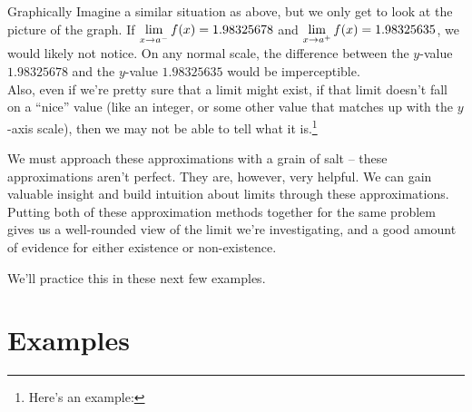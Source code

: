 \begin{defn}{Graphically}
  Imagine a similar situation as above, but we only get to look at the picture of the graph.
  If $\displaystyle \lim_{x\to a^-} f(x) = 1.98325678$ and $\displaystyle \lim_{x\to a^+} f(x) = 1.98325635$, we would likely not notice.
  On any normal scale, the difference between the $y$-value $1.98325678$ and the $y$-value $1.98325635$ would be imperceptible.\\

  Also, even if we're pretty sure that a limit might exist, if that limit doesn't fall on a ``nice'' value (like an integer, or some other value that matches up with the $y$-axis scale), then we may not be able to tell what it is.\footnote{Here's an example:
  }
\end{defn}

We must approach these approximations with a grain of salt -- these approximations aren't perfect.
They are, however, very helpful.
We can gain valuable insight and build intuition about limits through these approximations.
Putting both of these approximation methods together for the same problem gives us a well-rounded view of the limit we're investigating, and a good amount of evidence for either existence or non-existence.

We'll practice this in these next few examples.

\section*{Examples}


